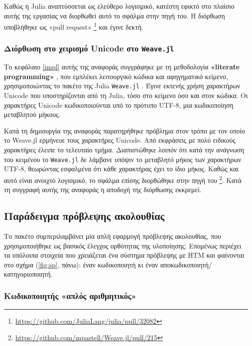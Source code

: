 	Καθώς η Julia αναπτύσσεται ως ελεύθερο λογισμικό, κατέστη εφικτό στο πλαίσιο αυτής της εργασίας να διορθωθεί αυτό το σφάλμα στην πηγή του.
	Η διόρθωση υποβλήθηκε ως «pull request» \footnote{\url{https://github.com/JuliaLang/julia/pull/32082}} και έγινε δεκτή.

	\subsubsection{Διόρθωση στο χειρισμό Unicode στο \texttt{Weave.jl}}

	Το κεφάλαιο \ref{impl} αυτής της αναφοράς συγγράφηκε με τη μεθοδολογία \textbf{«literate programming»} \parencite{knuthLiterateProgramming1984},
	που εμπλέκει λειτουργικό κώδικα και αφηγηματικό κείμενο,
	χρησιμοποιώντας το πακέτο της Julia \texttt{Weave.jl} \cite{pastellWeaveJlScientific2017}.
	Έγινε εκτενής χρήση χαρακτήρων Unicode που υποστηρίζονται από τη Julia, τόσο στο κείμενο όσο και στον κώδικα.
	Οι χαρακτήρες Unicode κωδικοποιούνται υπό το πρότυπο UTF-8, μια κωδικοποίηση μεταβλητού μήκους.

	Κατά τη δημιουργία της αναφοράς παρατηρήθηκε πρόβλημα στον τρόπο με τον οποίο το Weave.jl ερμήνευε τους χαρακτήρες Unicode.
	Από εκφράσεις με πολύ ειδικούς χαρακτήρες έλειπε το τελευταίο τμήμα.
	Διαπιστώθηκε λοιπόν ότι κατά την ανάγνωση του κειμένου το \texttt{Weave.jl} δε λάμβανε υπόψιν το μεταβλητό μήκος των χαρακτήρων UTF-8,
	θεωρώντας εσφαλμένα ότι κάθε χαρακτήρας έχει το ίδιο μήκος.
	Καθώς και αυτό είναι ανοιχτό λογισμικό, το σφάλμα επίσης διορθώθηκε στην πηγή του
	\footnote{\url{https://github.com/mpastell/Weave.jl/pull/215}}.
	Κατά τη συγγραφή αυτής της αναφοράς η αποδοχή της διόρθωσης εκκρεμεί.

\subsection{Παράδειγμα πρόβλεψης ακολουθίας} \label{conc:intro-tspred}

	Το πακέτο συμπεριλαμβάνει μία απλή εφαρμογή πρόβλεψης ακολουθίας, που χρησιμοποιήθηκε ως βασικός έλεγχος ορθότητας της υλοποίησης.
	Επομένως περιέχει τα υπόλοιπα στοιχεία που χρειάζεται ένα σύστημα πρόβλεψης με HTM και φαίνονται στο σχήμα (\ref{fig:sp}, πάνω):
	έναν κωδικοποιητή κι έναν αποκωδικοποιητή/κατηγοριοποιητή.

	\subsubsection{Κωδικοποιητής «απλός αριθμητικός»}

